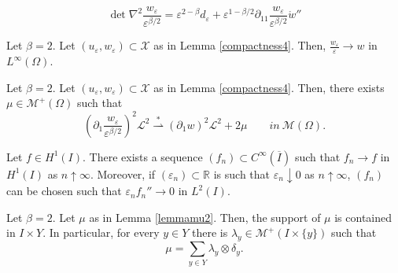 \documentclass[10pt,a4paper]{amsart}
\newcommand{\bbR}{\mathbb{R}}
\newcommand{\calL}{\mathcal{L}}
\newcommand{\calM}{\mathcal{M}}
\newcommand{\calX}{\mathcal{X}}
\newcommand\e{\varepsilon}
\newcommand\weakstar{\stackrel{\ast }{\rightharpoonup}}  %
\begin{document}
		\begin{equation}\label{eqdet}
			\det \nabla^2\frac{w_\e}{\e^{\beta/2}}=\e^{2-\beta}d_\e+\e^{1-\beta/2}\partial_{11}\frac{w_\e}{\e^{\beta/2}}\mathring{w}''
		\end{equation}

	\begin{lemma}\label{lemmaunif} Let $\beta =2$.
		Let $(u_\e, w_{\e})\subset \calX$  as in Lemma \ref{compactness4}. Then,
		$\frac{w_\e}{\e} \to w$ in $L^\infty(\Omega)$.
	\end{lemma}

	\begin{lemma}\label{lemmamu2}
		Let $\beta=2$. Let $(u_\e, w_\e)\subset \calX$ as in Lemma \ref{compactness4}. Then, there exists $\mu \in \calM^+(\Omega)$ such that
		\begin{equation}\label{cmp4}(\partial_1 \frac{w_\e}{\e^{\beta/2}})^2 \calL^2 \weakstar (\partial_1 w)^2\calL^2 + 2\mu \qquad  in \ \calM(\Omega).\end{equation}
	\end{lemma}

	\begin{lemma}\label{lemmader2}
		Let $f \in H^1(I)$. There exists a sequence $(f_n) \subset C^\infty(\overline{I})$ such that $f_n \to f$ in $H^1(I)$ as $n \uparrow \infty$. Moreover, if $(\e_n)\subset \bbR$ is such that $\e_n \downarrow 0$ as $n \uparrow \infty$,  $(f_n)$ can be chosen such that
		$\e_n f_n''\to 0$ in $L^2(I)$.
	\end{lemma}

	\begin{lemma}\label{lemmawsq}
		Let $\beta =2$.
		Let $\mu$ as in Lemma \ref{lemmamu2}. Then, the support of $\mu$ is contained in $I\times Y$.
		In particular,
		for  every $y\in Y$ there is $\lambda_y \in \calM^+(I\times \{y\})$ such that
		$$
		\mu = \sum_{y\in Y} \lambda_y\otimes \delta_y.
		$$
	\end{lemma}
\end{document}
